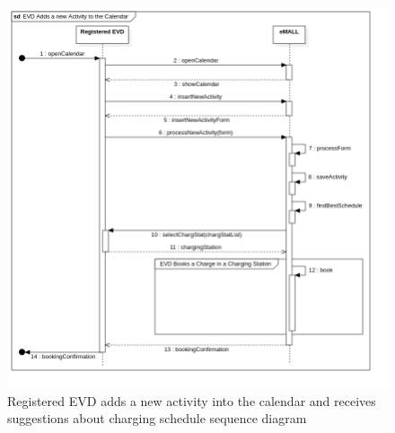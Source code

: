 \begin{center}
    \begin{figure} [H]
        \begin{center}
            \includegraphics[width=0.8\linewidth]{Images/SequenceDiagrams/evd_adds_a_new_activity_to_the_calendar}
            \caption{Registered EVD adds a new activity into the calendar and receives suggestions about charging schedule sequence diagram}
            \label{fig: evd_adds_activity_seq_diag}
        \end{center}
    \end{figure}
\end{center}


